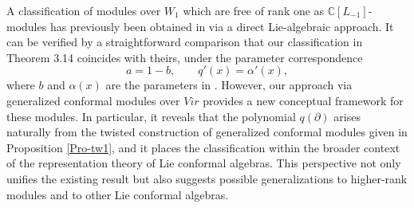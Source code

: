 \documentclass[12pt]{amsart}
\begin{document}
\begin{rmk}
A classification of modules over $W_1$ which are free of rank one as $\mathbb C[L_{-1}]$-modules has previously been obtained in \cite[Theorem 4.1]{HCL} via a direct Lie-algebraic approach. It can be verified by a straightforward comparison that our classification in Theorem 3.14 coincides with theirs, under the parameter correspondence
\[
a = 1-b, \qquad q'(x) = \alpha'(x),
\]
where $b$ and $\alpha(x)$ are the parameters in \cite[Theorem 4.1]{HCL}.
However, our approach via generalized conformal modules over $Vir$ provides a new conceptual framework for these modules. In particular, it reveals that the polynomial $q(\partial)$ arises naturally from the twisted construction of generalized conformal modules given in Proposition \ref{Pro-tw1}, and it places the classification within the broader context of the representation theory of Lie conformal algebras. This perspective not only unifies the existing result but also suggests possible generalizations to higher-rank modules and to other Lie conformal algebras.
\end{rmk}
\end{document}
